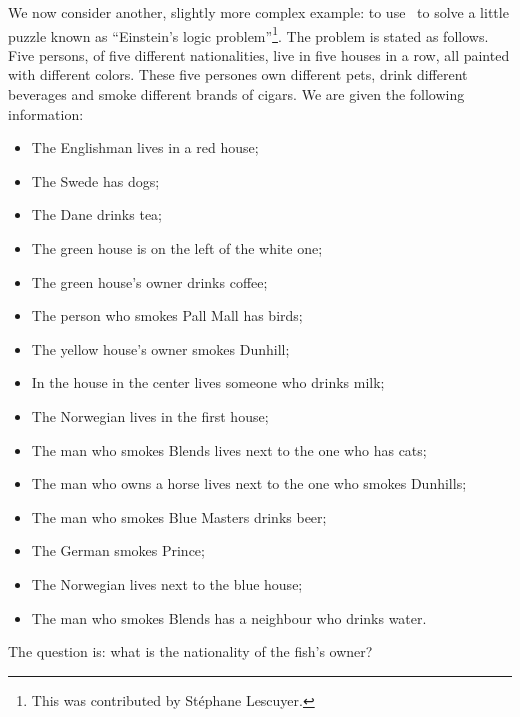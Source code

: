 We now consider another, slightly more complex example: to use \why\
to solve a little puzzle known as ``Einstein's logic
problem''\footnote{This was contributed by St\'ephane Lescuyer.}.
The problem is stated as follows. Five persons, of five
different nationalities, live in five houses in a row, all
painted with different colors.
These five persones own different pets, drink different beverages and
smoke different brands of cigars.
We are given the following information:
\begin{itemize}
\item The Englishman lives in a red house;

\item The Swede has dogs;

\item The Dane drinks tea;

\item The green house is on the left of the white one;

\item The green house's owner drinks coffee;

\item The person who smokes Pall Mall has birds;

\item The yellow house's owner smokes Dunhill;

\item In the house in the center lives someone who drinks milk;

\item The Norwegian lives in the first house;

\item The man who smokes Blends lives next to the one who has cats;

\item The man who owns a horse lives next to the one who smokes Dunhills;

\item The man who smokes Blue Masters drinks beer;

\item The German smokes Prince;

\item The Norwegian lives next to the blue house;

\item The man who smokes Blends has a neighbour who drinks water.
\end{itemize}
The question is: what is the nationality of the fish's owner?

